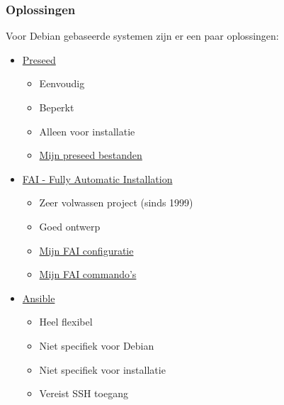 \documentclass{beamer}
\begin{document}
\begin{frame}
\frametitle{Oplossingen}
Voor Debian gebaseerde systemen zijn er een paar oplossingen:
\begin{itemize}
  \item \href{https://wiki.debian.org/DebianInstaller/Preseed}{Preseed} 
  \begin{itemize}
    \item Eenvoudig
    \item Beperkt
    \item Alleen voor installatie
    \item \href{https://slspeek.github.io/debian/}{Mijn preseed bestanden}
  \end{itemize}
  \item \href{https://fai-project.org/}{FAI - Fully Automatic Installation}
  \begin{itemize}
     \item Zeer volwassen project (sinds 1999)
     \item Goed ontwerp
     \item \href{https://slspeek.github.io/fai/}{Mijn FAI configuratie}
     \item \href{https://slspeek.github.io/fai-cmds/}{Mijn FAI commando's} 
  \end{itemize}
  \item \href{https://ansible.com/}{Ansible}
  \begin{itemize}
     \item Heel flexibel
     \item Niet specifiek voor Debian
     \item Niet specifiek voor installatie
     \item Vereist SSH toegang
  \end{itemize}
\end{itemize}
\end{frame}
\end{document}
